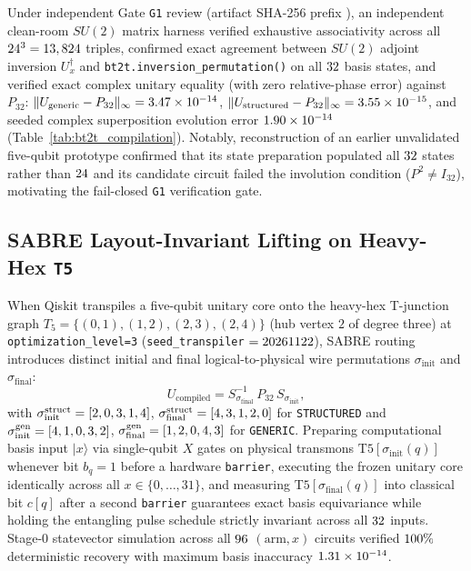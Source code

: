 \documentclass[aps,prx,twocolumn,superscriptaddress,nofootinbib]{revtex4-2}
\begin{document}
Under independent Gate \texttt{G1} review (artifact SHA-256 prefix \btGoneSha), an independent clean-room $SU(2)$ matrix harness verified exhaustive associativity across all $24^3 = 13,824$ triples, confirmed exact agreement between $SU(2)$ adjoint inversion $U_x^\dagger$ and \texttt{bt2t.inversion\_permutation()} on all $32$ basis states, and verified exact complex unitary equality (with zero relative-phase error) against $P_{32}$: $\|U_{\mathrm{generic}} - P_{32}\|_\infty = 3.47 \times 10^{-14}$, $\|U_{\mathrm{structured}} - P_{32}\|_\infty = 3.55 \times 10^{-15}$, and seeded complex superposition evolution error $1.90 \times 10^{-14}$ (Table~\ref{tab:bt2t_compilation}). Notably, reconstruction of an earlier unvalidated five-qubit prototype confirmed that its state preparation populated all $32$ states rather than $24$ and its candidate circuit failed the involution condition ($P^2 \neq I_{32}$), motivating the fail-closed \texttt{G1} verification gate.

\subsection{SABRE Layout-Invariant Lifting on Heavy-Hex \texttt{T5}}
When Qiskit transpiles a five-qubit unitary core onto the heavy-hex T-junction graph $T_5 = \{(0,1),(1,2),(2,3),(2,4)\}$ (hub vertex $2$ of degree three) at \texttt{optimization\_level=3} (\texttt{seed\_transpiler} $= 20261122$), SABRE routing introduces distinct initial and final logical-to-physical wire permutations $\sigma_{\mathrm{init}}$ and $\sigma_{\mathrm{final}}$:
\begin{equation}
  U_{\mathrm{compiled}} = S_{\sigma_{\mathrm{final}}}^{-1}\, P_{32}\, S_{\sigma_{\mathrm{init}}},
  \label{eq:sabre_layouts}
\end{equation}
with $\sigma_{\mathrm{init}}^{\mathrm{struct}} = [2, 0, 3, 1, 4]$, $\sigma_{\mathrm{final}}^{\mathrm{struct}} = [4, 3, 1, 2, 0]$ for \texttt{STRUCTURED} and $\sigma_{\mathrm{init}}^{\mathrm{gen}} = [4, 1, 0, 3, 2]$, $\sigma_{\mathrm{final}}^{\mathrm{gen}} = [1, 2, 0, 4, 3]$ for \texttt{GENERIC}. Preparing computational basis input $|x\rangle$ via single-qubit $X$ gates on physical transmons $\mathrm{T5}[\sigma_{\mathrm{init}}(q)]$ whenever bit $b_q = 1$ before a hardware \texttt{barrier}, executing the frozen unitary core identically across all $x \in \{0,\dots,31\}$, and measuring $\mathrm{T5}[\sigma_{\mathrm{final}}(q)]$ into classical bit $c[q]$ after a second \texttt{barrier} guarantees exact basis equivariance while holding the entangling pulse schedule strictly invariant across all $32$ inputs. Stage-0 statevector simulation across all $96$ $(\text{arm}, x)$ circuits verified $100\%$ deterministic recovery with maximum basis inaccuracy $1.31 \times 10^{-14}$.
\end{document}
